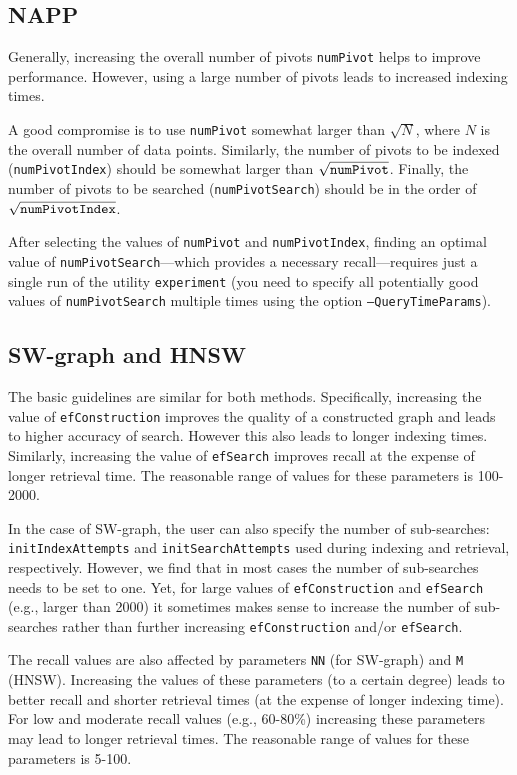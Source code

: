 \documentclass[runningheads,a4paper]{llncs}
\newcommand{\ttt}[1]{\texttt{#1}}
\begin{document}
\subsection{NAPP}
Generally, increasing the overall number of pivots \ttt{numPivot} helps to improve performance.
However, using a large number of pivots leads to increased indexing times. 

A good compromise is to use \ttt{numPivot} somewhat larger than $\sqrt N$, where $N$ is the overall
number of data points. Similarly, the number of pivots to be indexed (\ttt{numPivotIndex})
should be somewhat larger than $\sqrt{\mbox{\ttt{numPivot}}}$. Finally, the number of pivots
to be searched (\ttt{numPivotSearch}) should be in the order of $\sqrt{\mbox{\ttt{numPivotIndex}}}$.

After selecting the values of \ttt{numPivot} and \ttt{numPivotIndex}, finding an optimal value of
\ttt{numPivotSearch}---which provides a necessary recall---requires just a single run of the utility \ttt{experiment}
(you need to specify all potentially good values of \ttt{numPivotSearch} multiple times using the option
\ttt{--QueryTimeParams}). 


\subsection{SW-graph and HNSW}
The basic guidelines are similar for both methods.
Specifically, increasing the value of \ttt{efConstruction} improves the quality of a constructed graph and
leads to higher accuracy of search.
However this also leads to longer indexing times.
Similarly, increasing the value of \ttt{efSearch} improves recall at the expense of longer retrieval time. 
The reasonable range of values for these parameters is 100-2000.

In the case of SW-graph, the user can also specify the number of sub-searches: \ttt{initIndexAttempts} and
\ttt{initSearchAttempts} used during indexing and retrieval, respectively. 
However, we find that in most cases the number of sub-searches needs to be set to one.
Yet, for large values of \ttt{efConstruction} and \ttt{efSearch} (e.g., larger than 2000)
it sometimes makes sense to increase the number of sub-searches rather than further increasing
\ttt{efConstruction} and/or \ttt{efSearch}.

The recall values are also affected by parameters \ttt{NN} (for SW-graph) and \ttt{M} (HNSW).
Increasing the values of these parameters (to a certain degree) leads to better recall and shorter retrieval times
(at the expense of longer indexing time).  
For low and moderate recall values (e.g., 60-80\%) increasing these parameters may lead to longer retrieval times.
The reasonable range of values for these parameters is 5-100.
\end{document}

